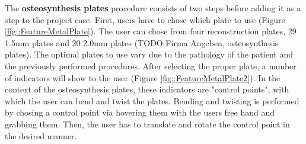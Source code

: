 The \textbf{osteosynthesis plates} procedure consists of two steps before adding it as a step to the project case.
First, users have to chose which plate to use (Figure \ref{fig::FeatureMetalPlate}).
The user can chose from four reconstruction plates, 29 1.5mm plates and 20 2.0mm plates (TODO Firma Angeben, osteosynthesis plates).
The optimal plates to use vary due to the pathology of the patient and the previously performed procedures.
After selecting the proper plate, a number of indicators will show to the user (Figure \ref{fig::FeatureMetalPlate2}).
In the context of the osteosynthesis plates, these indicators are "control points", with which the user can bend and twist the plates.
Bending and twisting is performed by chosing a control point via hovering them with the users free hand and grabbing them.
Then, the user has to translate and rotate the control point in the desired manner.
